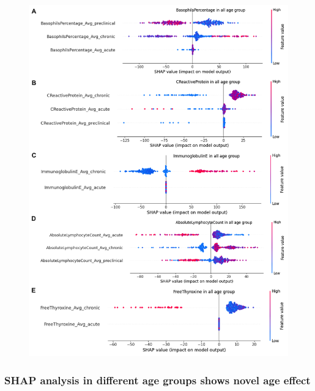 \documentclass[final,3p,times,authoryear]{elsarticle}
\begin{document}
\begin{figure}[t] 
    \centering
    \includegraphics[width=\textwidth]{figures/modelexplanation.png} 
    \caption{}\label{modelexplanation}
\end{figure}


\subsubsection{SHAP analysis in different age groups shows novel age effect}
\end{document}

